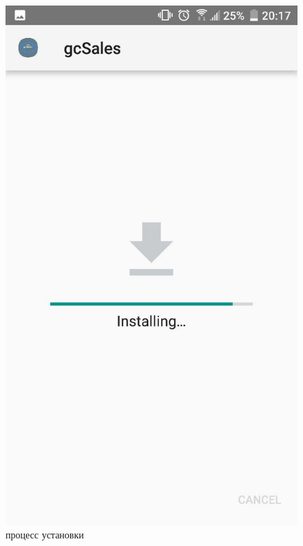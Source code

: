 \begin{figure}[h!]
    \includegraphics[height=0.38\textheight]{./screenshots/3/install_2.jpg}
    \caption{\small{процесс установки}}
    \label{install2}
    \endminipage\hfill

\end{figure}
